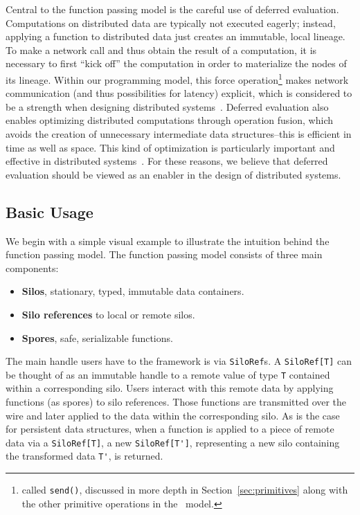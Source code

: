 \documentclass{jfp1}
\begin{document}
Central to the function passing model is the careful use of deferred evaluation.
Computations on distributed data are typically not executed eagerly; instead,
applying a function to distributed data just creates an immutable, local
lineage. To make a network call and thus obtain the result of a computation, it
is necessary to first ``kick off'' the computation in order to materialize the
nodes of its lineage. Within our programming model, this force operation\footnote{called
\texttt{send()}, discussed in more depth in Section~\ref{sec:primitives} along with 
the other primitive operations in the \FP~model.} makes 
network communication (and thus possibilities for latency)
explicit, which is considered to be a strength when designing distributed
systems~\cite{ANoteDistComp}. Deferred evaluation also enables optimizing
distributed computations through operation fusion, which avoids the creation of
unnecessary intermediate data structures--this is efficient in time as well as
space. This kind of optimization is particularly important and effective in
distributed systems~\cite{FlumeJava}. For these reasons, we believe that
deferred evaluation should be viewed as an enabler in the design of distributed
systems.

\subsection{Basic Usage}

We begin with a simple visual example to illustrate the intuition behind the 
function passing model. The function passing model consists of three main components: 

\begin{itemize}
	\item \textbf{Silos}, stationary, typed, immutable data containers.
	\item \textbf{Silo references} to local or remote silos.
	\item \textbf{Spores}, safe, serializable functions.
\end{itemize}



The main handle users have to the framework is via
\verb|SiloRef|s. A \verb|SiloRef[T]| can be thought of as an
immutable handle to a remote value of type \verb|T| contained within a
corresponding silo. Users interact with this remote data by applying
functions (as spores) to silo references. Those functions are
transmitted over the wire and later applied to the data within the
corresponding silo. As is the case for persistent data structures,
when a function is applied to a piece of remote data via a
\verb|SiloRef[T]|, a new \verb|SiloRef[T']|, representing a new silo
containing the transformed data \verb|T'|, is returned.
\end{document}
